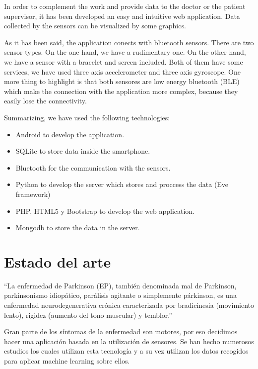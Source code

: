 \documentclass[11pt,spanish]{article}
\begin{document}
In order to complement the work and provide data to the doctor or the patient supervisor, it has been developed an easy and intuitive web application. Data collected by the sensors can be visualized by some graphics.
\newline

As it has been said, the application conects with bluetooth sensors. There are two sensor types. On the one hand, we have a rudimentary one. On the other hand, we have a sensor with a bracelet and screen included. Both of them have some services, we have used three axis accelerometer and three axis gyroscope. One more thing to highlight is that both sensores are low energy bluetooth (BLE) which make the connection with the application more complex, because they easily lose the connectivity.
\newline

Summarizing, we have used the following technologies:

\begin{itemize}
    \item Android to develop the application. 
	\item SQLite to store data inside the smartphone. 
	\item Bluetooth for the communication with the sensors. 
	\item Python to develop the server which stores and proccess the data (Eve framework)
    \item PHP, HTML5 y Bootstrap to develop the web application.
	\item Mongodb to store the data in the server.
    \newline
\end{itemize}
\newpage

\section*{Estado del arte}
“La enfermedad de Parkinson (EP), también denominada mal de Parkinson, parkinsonismo idiopático, parálisis agitante o simplemente párkinson, es una enfermedad neurodegenerativa crónica caracterizada por bradicinesia (movimiento lento), rigidez (aumento del tono muscular) y temblor.​”
\newline

Gran parte de los síntomas de la enfermedad son motores, por eso decidimos hacer una aplicación basada en la utilización de sensores. Se han hecho numerosos estudios los cuales utilizan esta tecnología y a su vez utilizan los datos recogidos para aplicar machine learning sobre ellos.
\newline
\end{document}

